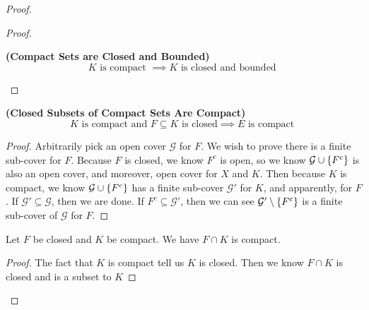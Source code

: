 \documentclass{report}
\begin{document}
\begin{proof}
\begin{proof}
\begin{corollary}
\label{3.6.6}
\textbf{(Compact Sets are Closed and Bounded)}
\begin{equation}
K\text{ is compact }\implies K\text{ is closed and bounded }
\end{equation}
\end{corollary}
\end{proof}
\begin{theorem}
\label{3.6.7}
\textbf{(Closed Subsets of Compact Sets Are Compact)} 
\begin{equation}
\text{$K$ is compact and  $F\subseteq K$ is closed}\implies E\text{ is compact }
\end{equation}
\end{theorem}
\begin{proof}
Arbitrarily pick an open cover $\mathcal{G}$ for $F$. We wish to prove there is a finite sub-cover for $F$. Because $F$ is closed, we know $F^c$ is open, so we know  $\mathcal{G}\cup \{ F^c \}$ is also an open cover, and moreover, open cover for $X$ and $K$. Then because $K$ is compact, we know $\mathcal{G}\cup \{ F^c \}$ has a finite sub-cover $\mathcal{G}'$ for $K$, and apparently, for $F$. If  $\mathcal{G}'\subseteq \mathcal{G}$, then we are done. If $F^c\subseteq \mathcal{G}'$, then we can see $\mathcal{G}'\setminus \{ F^c \}$ is a finite sub-cover of $\mathcal{G}$ for $F$.
\end{proof}
\begin{corollary}
\label{3.6.8}
Let $F$ be closed and  $K$ be compact. We have $F\cap K$ is compact.
\end{corollary}
\begin{proof} 
The fact that  $K$ is compact tell us $K$ is closed. Then we know $F\cap K$ is closed and is a subset to $K$
\end{proof}

\end{proof}
\end{document}
